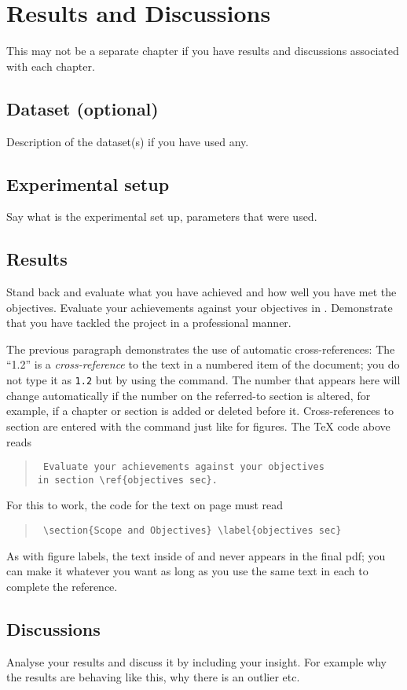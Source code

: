 \chapter{Results and Discussions}

This may not be a separate chapter if you have results and discussions 
associated with each chapter.  

\section{Dataset (optional)}
Description of the dataset(s) if you have used any.

\section{Experimental setup}
Say what is the experimental set up, parameters that were used. 

\section{Results}
Stand back and evaluate what you have achieved and how well you have met the 
objectives. Evaluate your achievements against your objectives in 
. Demonstrate that you have tackled the project in a 
professional manner. 

The previous paragraph demonstrates the use of automatic cross-references:  The 
``1.2'' is a \textit{cross-reference} to the text in a numbered item of the 
document; you do not type it as \texttt{1.2} but by using the  
command. The number that appears here will change automatically if the number 
on the referred-to section is altered, for example, if a chapter or section is 
added or deleted before it. Cross-references to section are entered with the 
 command just like for figures. The \TeX{} code above reads
\begin{quote}\tt
	Evaluate your achievements against your objectives \\[-0.5em]
	in section \textbackslash{}ref\{objectives sec\}.
\end{quote}
For this to work, the code for the text on page \pageref{objectives sec} must 
read
\begin{quote}\tt
	\textbackslash{}section\{Scope and Objectives\} 
	\textbackslash{}label\{objectives sec\}
\end{quote}
As with figure labels, the text inside of  and  never 
appears in the final pdf; you can make it whatever you want as long as you use 
the same text in each to complete the reference.

\section{Discussions}
Analyse your results and discuss it by including your insight. For example why 
the results are behaving like this, why there is an outlier etc.
